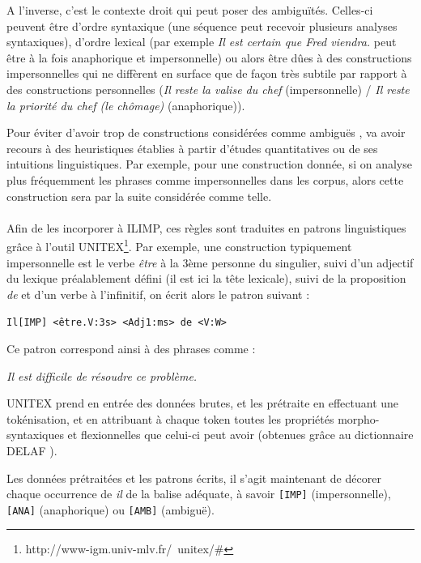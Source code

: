 \documentclass[a4paper,12pt]{article}
\begin{document}
A l'inverse, c'est le contexte droit qui peut poser des ambiguïtés. Celles-ci peuvent être d'ordre syntaxique (une séquence peut recevoir plusieurs analyses syntaxiques), d'ordre lexical (par exemple \og{}\textit{Il est certain que Fred viendra.}\fg{} peut être à la fois anaphorique et impersonnelle) ou alors être dûes à des constructions impersonnelles qui ne diffèrent en surface que de façon très subtile par rapport à des constructions personnelles (\og{}\textit{Il reste la valise du chef}\fg{} (impersonnelle) / \og{}\textit{Il reste la priorité du chef (le chômage)}\fg{} (anaphorique)).

Pour éviter d'avoir trop de constructions considérées comme \og ambiguës \fg{}, \citeauthor{danlos-ilimp-taln2005} va avoir recours à des heuristiques établies à partir d'études quantitatives ou de ses intuitions linguistiques. Par exemple, pour une construction donnée, si on analyse plus fréquemment les phrases comme impersonnelles dans les corpus, alors cette construction sera par la suite considérée comme telle.

\paragraph*{}
Afin de les incorporer à ILIMP, ces règles sont traduites en patrons linguistiques grâce à l'outil UNITEX\footnote{http://www-igm.univ-mlv.fr/~unitex/\#}. Par exemple, une construction typiquement impersonnelle est le verbe \og \textit{être} \fg{} à la 3ème personne du singulier, suivi d'un adjectif du lexique préalablement défini (il est ici la tête lexicale), suivi de la proposition \og \textit{de} \fg{} et d'un verbe à l'infinitif, on écrit alors le patron suivant :

\verb!Il[IMP] <être.V:3s> <Adj1:ms> de <V:W>!

Ce patron correspond ainsi à des phrases comme :

\og{}\textit{Il est difficile de résoudre ce problème.}\fg{}

UNITEX prend en entrée des données brutes, et les prétraite en effectuant une tokénisation, et en attribuant à chaque token toutes les propriétés morpho-syntaxiques et flexionnelles que celui-ci peut avoir (obtenues grâce au dictionnaire DELAF \citet{courtois}).

Les données prétraitées et les patrons écrits, il s'agit maintenant de décorer chaque occurrence de \og \textit{il} \fg{} de la balise adéquate, à savoir \verb![IMP]! (impersonnelle),  \verb![ANA]! (anaphorique) ou \verb![AMB]! (ambiguë).
\end{document}
